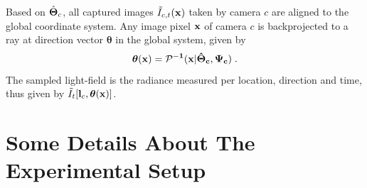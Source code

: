 \documentclass[runningheads]{llncs}
\begin{document}
Based on $\hat{\bf \Theta}_c$, all captured images $\tilde I_{c,t}(\bf x)$ taken by camera $c$ are aligned to the global coordinate system. Any image pixel ${\bf x}$ of camera $c$ is backprojected to a ray at direction vector ${\bm \theta}$ in the global system, given by
\begin{equation}
 {\bm \theta}(\bf x)={\cal P}^{-1}({\bf x}|\hat{\bf \Theta}_c,\Psi_c)
  \;.
 \label{eq:thetac}
\end{equation}
The sampled light-field is the radiance measured per location, direction and time, thus given by
$\tilde I_t[{\bf l}_c,{\bm \theta}(\bf x)]$.

\section{Some Details About The Experimental Setup}
\label{sec:set}
\end{document}
